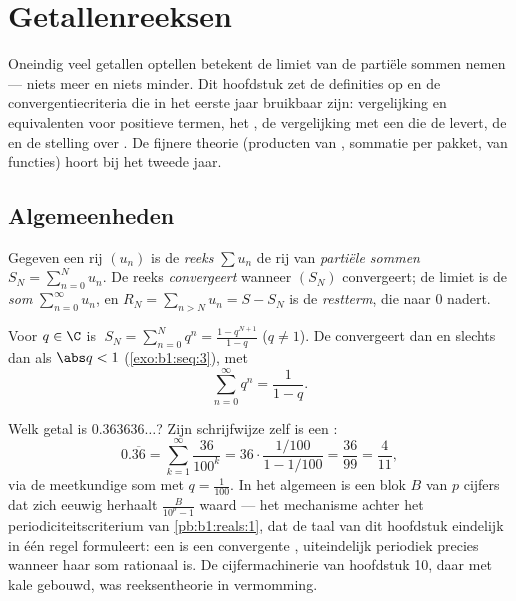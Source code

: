 \chapter{Getallenreeksen}\label{ch:b1:series}

Oneindig veel getallen optellen betekent de limiet van de partiële
sommen nemen --- niets meer en niets minder. Dit hoofdstuk zet de
definities op en de convergentiecriteria die in het eerste jaar
bruikbaar zijn: vergelijking en equivalenten voor positieve termen,
het , de vergelijking met een  die de
 levert, de  en de stelling over
. De fijnere theorie (producten van ,
sommatie per pakket,  van functies) hoort bij het tweede
jaar.

\section{Algemeenheden}

\begin{definition}\label{def:b1:series:def}
Gegeven een rij $(u_n)$ is de \emph{reeks} $\sum u_n$
de rij van \emph{partiële sommen} $S_N = \sum_{n=0}^{N} u_n$. De
reeks \emph{convergeert} wanneer $(S_N)$ convergeert; de limiet is
de \emph{som} $\sum_{n=0}^{\infty} u_n$, en $R_N = \sum_{n > N} u_n
= S - S_N$ is de \emph{restterm}, die naar $0$ nadert.
\end{definition}

\begin{example}\label{ex:b1:series:geometric}
Voor $q \in \C$ is $\;S_N = \sum_{n=0}^{N} q^n = \frac{1 -
q^{N+1}}{1-q}$ ($q \neq 1$). De  convergeert dan en slechts dan
als $\abs q < 1$ (\cref{exo:b1:seq:3}), met
\[
\sum_{n=0}^{\infty} q^n = \frac{1}{1 - q} .
\]
\end{example}

\begin{example}\label{ex:b1:series:periodicdecimal}
Welk getal is $0.363636\dots$? Zijn schrijfwijze zelf is een
:
\[
0.\overline{36} = \sum_{k=1}^{\infty} \frac{36}{100^k}
= 36\cdot\frac{1/100}{1 - 1/100} = \frac{36}{99} =
\frac{4}{11} ,
\]
via de meetkundige som met $q = \frac{1}{100}$. In het algemeen
is een blok $B$ van $p$ cijfers dat zich eeuwig herhaalt
$\frac{B}{10^p - 1}$ waard --- het mechanisme achter het
periodiciteitscriterium van \cref{pb:b1:reals:1}, dat de taal van
dit hoofdstuk eindelijk in één regel formuleert: een  is een convergente , uiteindelijk periodiek
precies wanneer haar som rationaal is. De cijfermachinerie van
hoofdstuk 10, daar met kale  gebouwd, was
reeksentheorie in vermomming.
\end{example}

